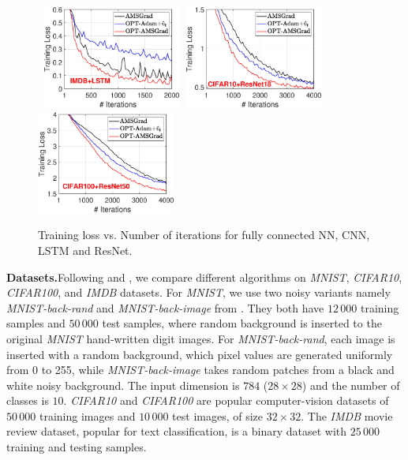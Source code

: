\documentclass[wcp]{jmlr}
\begin{document}
\begin{figure}[t]
\mbox{\hspace{-0.2in}
\includegraphics[width=1.8in]{simulation/fig2/imdb_lstm_train_loss_no1.eps}\hspace{-0.1in}
\includegraphics[width=1.8in]{simulation/fig2/cifar10_resnet_train_loss.eps}\hspace{-0.1in}
\includegraphics[width=1.8in]{simulation/fig2/cifar100_resnet_train_loss.eps}
}
\caption{Training loss vs. Number of iterations for fully connected NN, CNN, LSTM and ResNet.}
\label{fig:train_loss}\vspace{-0.15in}
\end{figure}

\textbf{Datasets.}\hspace{0.1in}Following \cite{RKK18} and \cite{KB15}, we compare different algorithms on \textit{MNIST}, \textit{CIFAR10},
\textit{CIFAR100}, and \textit{IMDB} datasets. 
For \textit{MNIST}, we use two noisy variants namely \textit{MNIST-back-rand} and \textit{MNIST-back-image} from \cite{MNIST07}. 
They both have $12\,000$ training samples and $50\,000$ test samples, where random background is inserted to the original \textit{MNIST} hand-written digit images. 
For \textit{MNIST-back-rand}, each image is inserted with a random background, which pixel values are generated uniformly from 0 to 255, while \textit{MNIST-back-image} takes random patches from a black and white noisy background.
The input dimension is $784$ ($28\times 28$) and the number of classes is $10$. 
\textit{CIFAR10} and \textit{CIFAR100} are popular computer-vision datasets of $50\,000$ training images and $10\,000$ test images, of size $32\times 32$. 
The \textit{IMDB} movie review dataset, popular for text classification, is a binary dataset with $25\,000$ training and testing samples. 
\end{document}

